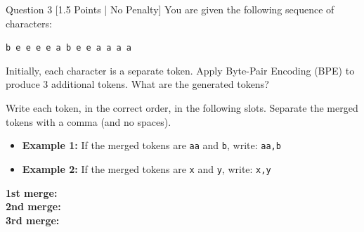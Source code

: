 \documentclass[11pt,a4paper]{article}
\begin{document}
\begin{questionbox}{Question 3 \hfill [1.5 Points | No Penalty]}
You are given the following sequence of characters:
\begin{center}
    \texttt{b e e e e a b e e a a a a}
\end{center}
Initially, each character is a separate token. Apply Byte-Pair Encoding (BPE) to produce 3 additional tokens. What are the generated tokens?

\medskip\noindent
Write each token, in the correct order, in the following slots. Separate the merged tokens with a comma (and no spaces).
\begin{itemize}[leftmargin=2em,itemsep=1pt]
    \item \textbf{Example 1:} If the merged tokens are \texttt{aa} and \texttt{b}, write: \texttt{aa,b}
    \item \textbf{Example 2:} If the merged tokens are \texttt{x} and \texttt{y}, write: \texttt{x,y}
\end{itemize}

\medskip\noindent
\textbf{1st merge:} \underline{\hspace{4cm}}\\
\textbf{2nd merge:} \underline{\hspace{4cm}}\\
\textbf{3rd merge:} \underline{\hspace{4cm}}
\end{questionbox}

\vspace{0.3cm}
\end{document}
